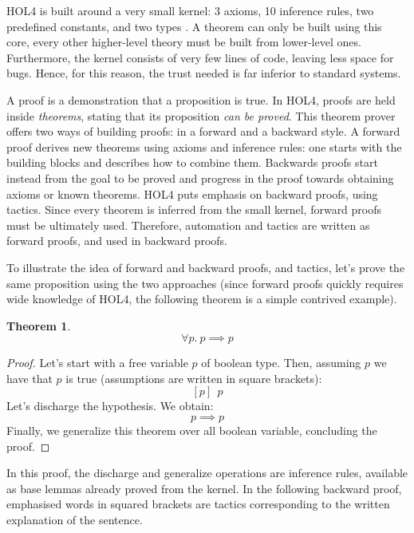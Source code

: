 \documentclass{kththesis}
\newtheorem{theorem}{Theorem}[section]
\begin{document}
HOL4 is built around a very small kernel: 3 axioms, 10 inference rules, two predefined constants, and two types \cite{tuerk_interactive_nodate} \footnotemark. A theorem can only be built using this core, every other higher-level theory must be built from lower-level ones. Furthermore, the kernel consists of very few lines of code, leaving less space for bugs. Hence, for this reason, the trust needed is far inferior to standard systems.


A proof is a demonstration that a proposition is true. In HOL4, proofs are held inside \textit{theorems}, stating that its proposition \textit{can be proved}. This theorem prover offers two ways of building proofs: in a forward and a backward style. A forward proof derives new theorems using axioms and inference rules: one starts with the building blocks and describes how to combine them. Backwards proofs start instead from the goal to be proved and progress in the proof towards obtaining axioms or known theorems. HOL4 puts emphasis on backward proofs, using tactics. Since every theorem is inferred from the small kernel, forward proofs must be ultimately used. Therefore, automation and tactics are written as forward proofs, and used in backward proofs.

To illustrate the idea of forward and backward proofs, and tactics, let's prove the same proposition using the two approaches (since forward proofs quickly requires wide knowledge of HOL4, the following theorem is a simple contrived example).

\begin{theorem}
\begin{equation}
    \forall p.~p \implies p
    \label{hol4-simple-eq-for-proof}
\end{equation}
\end{theorem}

{
\renewcommand*{\proofname}{Forward proof}
\begin{proof}
Let's start with a free variable $p$ of boolean type. Then, assuming $p$ we have that $p$ is true (assumptions are written in square brackets):
$$[p]~~p$$
Let's discharge the hypothesis. We obtain:
$$p \implies p$$
Finally, we generalize this theorem over all boolean variable, concluding the proof.
\end{proof}
}

In this proof, the discharge and generalize operations are inference rules, available as base lemmas already proved from the kernel. In the following backward proof, emphasised words in squared brackets are tactics corresponding to the written explanation of the sentence.
\end{document}
